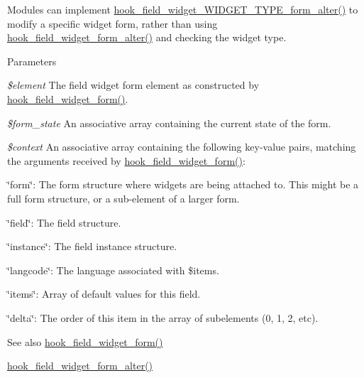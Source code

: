 Modules can implement \hyperlink{group__field__widget_ga6f53f1874a16e18c27dcc0cc4e7c1ec6}{hook\_\-field\_\-widget\_\-WIDGET\_\-TYPE\_\-form\_\-alter()} to modify a specific widget form, rather than using \hyperlink{group__field__widget_gaca9d517ab0584fa2428779d8aa24a441}{hook\_\-field\_\-widget\_\-form\_\-alter()} and checking the widget type.


\begin{DoxyParams}{Parameters}
\item[{\em \$element}]The field widget form element as constructed by \hyperlink{group__field__widget_gaa9b0e55fd0eb57ac0f9c7c30d251971b}{hook\_\-field\_\-widget\_\-form()}. \item[{\em \$form\_\-state}]An associative array containing the current state of the form. \item[{\em \$context}]An associative array containing the following key-\/value pairs, matching the arguments received by \hyperlink{group__field__widget_gaa9b0e55fd0eb57ac0f9c7c30d251971b}{hook\_\-field\_\-widget\_\-form()}:
\begin{DoxyItemize}
\item \char`\"{}form\char`\"{}: The form structure where widgets are being attached to. This might be a full form structure, or a sub-\/element of a larger form.
\item \char`\"{}field\char`\"{}: The field structure.
\item \char`\"{}instance\char`\"{}: The field instance structure.
\item \char`\"{}langcode\char`\"{}: The language associated with \$items.
\item \char`\"{}items\char`\"{}: Array of default values for this field.
\item \char`\"{}delta\char`\"{}: The order of this item in the array of subelements (0, 1, 2, etc).
\end{DoxyItemize}\end{DoxyParams}
\begin{DoxySeeAlso}{See also}
\hyperlink{group__field__widget_gaa9b0e55fd0eb57ac0f9c7c30d251971b}{hook\_\-field\_\-widget\_\-form()} 

\hyperlink{group__field__widget_gaca9d517ab0584fa2428779d8aa24a441}{hook\_\-field\_\-widget\_\-form\_\-alter()} 
\end{DoxySeeAlso}
